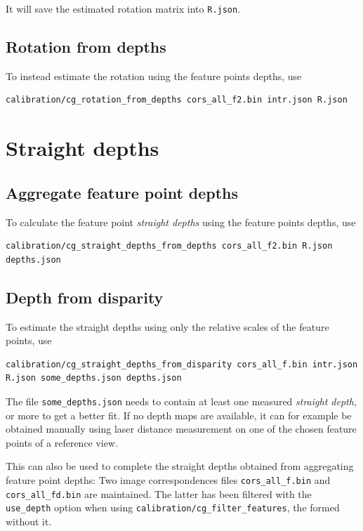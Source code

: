 \documentclass{scrreprt}
\begin{document}
\noindent It will save the estimated rotation matrix into \texttt{R.json}.


\subsection{Rotation from depths}
To instead estimate the rotation using the feature points depths, use
\begin{lstlisting}[language=bash]
calibration/cg_rotation_from_depths cors_all_f2.bin intr.json R.json
\end{lstlisting}


\section{Straight depths}
\subsection{Aggregate feature point depths}
To calculate the feature point \emph{straight depths} using the feature points depths, use
\begin{lstlisting}[language=bash]
calibration/cg_straight_depths_from_depths cors_all_f2.bin R.json
depths.json
\end{lstlisting}

\subsection{Depth from disparity}
To estimate the straight depths using only the relative scales of the feature points, use
\begin{lstlisting}[language=bash]
calibration/cg_straight_depths_from_disparity cors_all_f.bin intr.json
R.json some_depths.json depths.json
\end{lstlisting}

\noindent The file \texttt{some\_depths.json} needs to contain at least one measured \emph{straight depth}, or more to get a better fit. If no depth maps are available, it can for example be obtained manually using laser distance measurement on one of the chosen feature points of a reference view.

This can also be used to complete the straight depths obtained from aggregating feature point depths: Two image correspondences files \texttt{cors\_all\_f.bin} and \texttt{cors\_all\_fd.bin} are maintained. The latter has been filtered with the \texttt{use\_depth} option when using \texttt{calibration/cg\_filter\_features}, the formed without it. 
\end{document}
